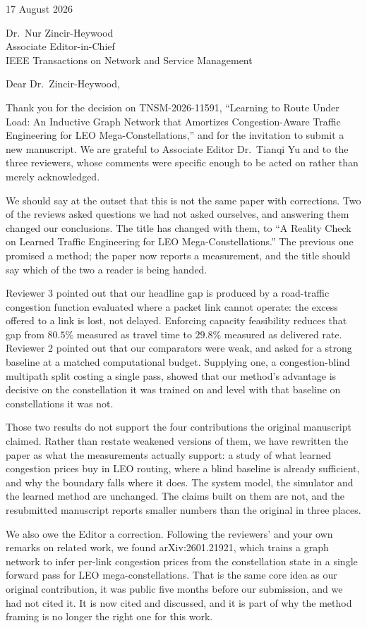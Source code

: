 \documentclass[11pt]{article}
\begin{document}
\hfill 17 August 2026

\bigskip
Dr.\ Nur Zincir-Heywood\\
Associate Editor-in-Chief\\
IEEE Transactions on Network and Service Management

\bigskip
Dear Dr.\ Zincir-Heywood,

Thank you for the decision on TNSM-2026-11591, ``Learning to Route Under Load: An Inductive Graph
Network that Amortizes Congestion-Aware Traffic Engineering for LEO Mega-Constellations,'' and for
the invitation to submit a new manuscript. We are grateful to Associate Editor Dr.\ Tianqi Yu and
to the three reviewers, whose comments were specific enough to be acted on rather than merely
acknowledged.

We should say at the outset that this is not the same paper with corrections. Two of the reviews
asked questions we had not asked ourselves, and answering them changed our conclusions. The title has changed with them, to ``A Reality Check on Learned Traffic Engineering for LEO
Mega-Constellations.'' The previous one promised a method; the paper now reports a measurement,
and the title should say which of the two a reader is being handed.

Reviewer 3 pointed out that our headline gap is produced by a road-traffic congestion function
evaluated where a packet link cannot operate: the excess offered to a link is lost, not delayed.
Enforcing capacity feasibility reduces that gap from $80.5\%$ measured as travel time to $29.8\%$
measured as delivered rate. Reviewer 2 pointed out that our comparators were weak, and asked for a
strong baseline at a matched computational budget. Supplying one, a congestion-blind multipath
split costing a single pass, showed that our method's advantage is decisive on the constellation it
was trained on and level with that baseline on constellations it was not.

Those two results do not support the four contributions the original manuscript claimed. Rather
than restate weakened versions of them, we have rewritten the paper as what the measurements
actually support: a study of what learned congestion prices buy in LEO routing, where a blind
baseline is already sufficient, and why the boundary falls where it does. The system model, the
simulator and the learned method are unchanged. The claims built on them are not, and the
resubmitted manuscript reports smaller numbers than the original in three places.

We also owe the Editor a correction. Following the reviewers' and your own remarks on related work,
we found arXiv:2601.21921, which trains a graph network to infer per-link congestion prices from
the constellation state in a single forward pass for LEO mega-constellations. That is the same core
idea as our original contribution, it was public five months before our submission, and we had not
cited it. It is now cited and discussed, and it is part of why the method framing is no longer the
right one for this work.
\end{document}
